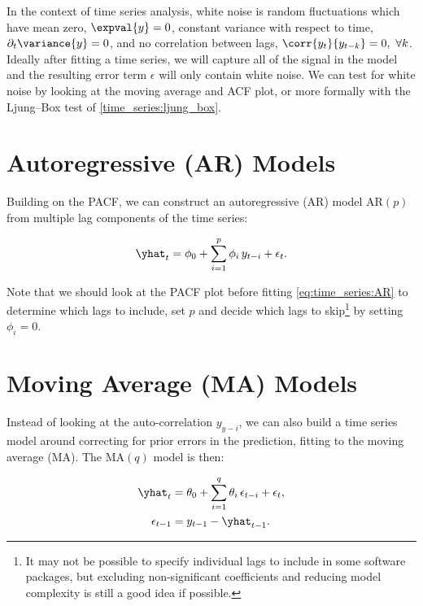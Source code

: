 In the context of time series analysis, white noise is random fluctuations which
have mean zero, $\expval{y} = 0$,
constant variance with respect to time, $\partial_{t} \variance{y} = 0$,
and no correlation between lags, $\corr{y_{t}}{y_{t-k}} = 0,\,\, \forall k$.
Ideally after fitting a time series, we will capture all of the signal
in the model and the resulting error term $\epsilon$ will only contain white noise.
We can test for white noise by looking at the moving average and ACF plot,
or more formally with the Ljung--Box test of \cref{time_series:ljung_box}.

\section{Autoregressive (AR) Models}
\label{time_series:AR}
Building on the PACF, we can construct an autoregressive (AR) model $\text{AR}\left(p\right)$
from multiple lag components of the time series:

\begin{equation}\label{eq:time_series:AR}
\yhat_{t} = \phi_{0} + \sum_{i=1}^{p} \phi_{i}\, y_{t-i} + \epsilon_{t}.
\end{equation}

Note that we should look at the PACF plot before fitting \cref{eq:time_series:AR}
to determine which lags to include,
\ie set $p$ and decide which lags to skip\footnote{It may not be possible
to specify individual lags to include in some software packages,
but excluding non-significant coefficients and reducing model complexity
is still a good idea if possible.} by setting $\phi_{i} = 0$.

\section{Moving Average (MA) Models}
\label{time_series:MA}

Instead of looking at the auto-correlation $y_{y-i}$,
we can also build a time series model around
correcting for prior errors in the prediction,
\ie fitting to the moving average (MA).
The $\text{MA}\left(q\right)$ model
is then:

\begin{subequations}\label{eq:time_series:MA}
\begin{align}
\yhat_{t} &= \theta_{0} + \sum_{i=1}^{q} \theta_{i}\, \epsilon_{t-i} + \epsilon_{t}, \label{eq:time_series:MA_y} \\
\epsilon_{t-1} &= y_{t-1} - \yhat_{t-1}. \label{eq:time_series:MA_epsilon}
\end{align}
\end{subequations}

